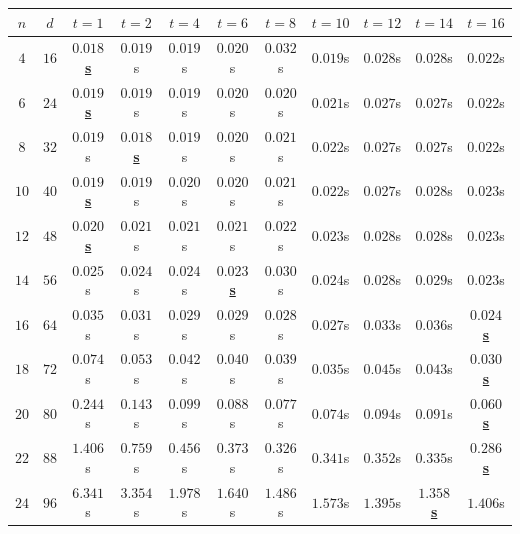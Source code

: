 \begin{table}[ht]
    \centering
    \begin{adjustwidth}{-0.35cm}{-0.35cm}
    {\renewcommand{\arraystretch}{1.1}
        \setlength{\tabcolsep}{3.55pt}
        \small
        \begin{tabular}{ccccccccccc}
            $n$ & $d$ & $t = 1$ & $t = 2$ & $t = 4$ & $t = 6$ & $t = 8$ & $t = 10$ & $t = 12$ & $t = 14$ & $t = 16$ \\
            \hline
            $4$ & $16$ & \underline{$\mathbf{0.018}$\textbf{s}} & $0.019$s & $0.019$s & $0.020$s & $0.032$s & $0.019$s & $0.028$s & $0.028$s & $0.022$s \\
            $6$ & $24$ & \underline{$\mathbf{0.019}$\textbf{s}} & $0.019$s & $0.019$s & $0.020$s & $0.020$s & $0.021$s & $0.027$s & $0.027$s & $0.022$s \\
            $8$ & $32$ & $0.019$s & \underline{$\mathbf{0.018}$\textbf{s}} & $0.019$s & $0.020$s & $0.021$s & $0.022$s & $0.027$s & $0.027$s & $0.022$s \\
            $10$ & $40$ & \underline{$\mathbf{0.019}$\textbf{s}} & $0.019$s & $0.020$s & $0.020$s & $0.021$s & $0.022$s & $0.027$s & $0.028$s & $0.023$s \\
            $12$ & $48$ & \underline{$\mathbf{0.020}$\textbf{s}} & $0.021$s & $0.021$s & $0.021$s & $0.022$s & $0.023$s & $0.028$s & $0.028$s & $0.023$s \\
            $14$ & $56$ & $0.025$s & $0.024$s & $0.024$s & \underline{$\mathbf{0.023}$\textbf{s}} & $0.030$s & $0.024$s & $0.028$s & $0.029$s & $0.023$s \\
            $16$ & $64$ & $0.035$s & $0.031$s & $0.029$s & $0.029$s & $0.028$s & $0.027$s & $0.033$s & $0.036$s & \underline{$\mathbf{0.024}$\textbf{s}} \\
            $18$ & $72$ & $0.074$s & $0.053$s & $0.042$s & $0.040$s & $0.039$s & $0.035$s & $0.045$s & $0.043$s & \underline{$\mathbf{0.030}$\textbf{s}} \\
            $20$ & $80$ & $0.244$s & $0.143$s & $0.099$s & $0.088$s & $0.077$s & $0.074$s & $0.094$s & $0.091$s & \underline{$\mathbf{0.060}$\textbf{s}} \\
            $22$ & $88$ & $1.406$s & $0.759$s & $0.456$s & $0.373$s & $0.326$s & $0.341$s & $0.352$s & $0.335$s & \underline{$\mathbf{0.286}$\textbf{s}} \\
            $24$ & $96$ & $6.341$s & $3.354$s & $1.978$s & $1.640$s & $1.486$s & $1.573$s & $1.395$s & \underline{$\mathbf{1.358}$\textbf{s}} & $1.406$s \\

\end{tabular}}
\end{adjustwidth}
\end{table}
